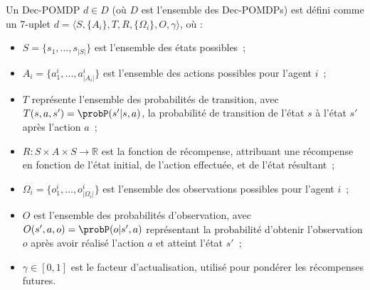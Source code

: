 Un Dec-POMDP $d \in D$ (où $D$ est l'ensemble des Dec-POMDPs) est défini comme un 7-uplet $d = \langle S, \{A_i\}, T, R, \{\Omega_i\}, O, \gamma \rangle$, où :
\begin{itemize}
    \item $S = \{s_1,\dots,s_{|S|}\}$ est l'ensemble des états possibles~;
    \item $A_{i} = \{a_{1}^{i},\dots,a_{|A_{i}|}^{i}\}$ est l'ensemble des actions possibles pour l'agent $i$~;
    \item $T$ représente l'ensemble des probabilités de transition, avec $T(s,a,s') = \probP(s'|s,a)$, la probabilité de transition de l'état $s$ à l'état $s'$ après l'action $a$~;
    \item $R: S \times A \times S \rightarrow \mathbb{R}$ est la fonction de récompense, attribuant une récompense en fonction de l'état initial, de l'action effectuée, et de l'état résultant~;
    \item $\Omega_{i} = \{o_{1}^{i},\dots,o_{|\Omega_{i}|}^{i}\}$ est l'ensemble des observations possibles pour l'agent $i$~;
    \item $O$ est l'ensemble des probabilités d'observation, avec $O(s',a,o) = \probP(o|s',a)$ représentant la probabilité d'obtenir l'observation $o$ après avoir réalisé l'action $a$ et atteint l'état $s'$~;
    \item $\gamma \in [0,1]$ est le facteur d'actualisation, utilisé pour pondérer les récompenses futures.
\end{itemize}

